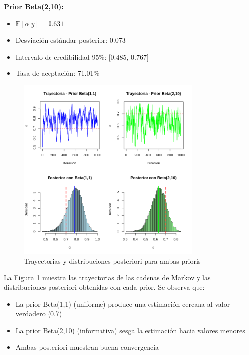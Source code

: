 \documentclass[12pt,a4paper]{article}
\begin{document}
\textbf{Prior Beta(2,10):}
\begin{itemize}
    \item $\mathbb{E}[\alpha|y] = 0.631$
    \item Desviación estándar posterior: 0.073
    \item Intervalo de credibilidad 95\%: [0.485, 0.767]
    \item Tasa de aceptación: 71.01\%
\end{itemize}

\begin{figure}[h]
\centering
\includegraphics[width=0.8\textwidth]{images/Problem3_2.png}
\caption{Trayectorias y distribuciones posteriori para ambas prioris}
\label{fig:trayectorias_problema3}
\end{figure}

La Figura \ref{fig:trayectorias_problema3} muestra las trayectorias de las cadenas de Markov y las distribuciones posteriori obtenidas con cada prior. Se observa que:
\begin{itemize}
    \item La prior Beta(1,1) (uniforme) produce una estimación cercana al valor verdadero (0.7)
    \item La prior Beta(2,10) (informativa) sesga la estimación hacia valores menores
    \item Ambas posteriori muestran buena convergencia
\end{itemize}
\end{document}
